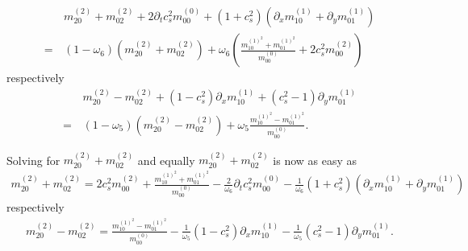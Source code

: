 \begin{align}
  \label{eq: auxiliaries 4}
  &m_{20}^{(2)} + m_{02}^{(2)} + 2\partial_t c_s^2 m_{00}^{(0)} + (1+c_s^2)(\partial_x m_{10}^{(1)} + \partial_y m_{01}^{(1)})
  \\=\,&
  (1-\omega_6)\left(  m_{20}^{(2)} + m_{02}^{(2)}\right)
  + \omega_6 \left( \frac{ m_{10}^{{(1)}^2} + m_{01}^{{(1)}^2}}{m_{00}^{(0)}}
  + 2 c_s^2 m_{00}^{(2)} \right)
\end{align}
respectively
\begin{align}
  \label{eq: auxiliaries 5}
  &m_{20}^{(2)} - m_{02}^{(2)} + (1 - c_s^2)\partial_x m_{10}^{(1)} + (c_s^2 - 1)\partial_y m_{01}^{(1)}
  \\=\,&
  (1-\omega_5) \left(m_{20}^{(2)}-m_{02}^{(2)}\right) + \omega_5 \frac{ m_{10}^{{(1)}^2} - m_{01}^{{(1)}^2}}{m_{00}^{(0)}}.
\end{align}

Solving for $m_{20}^{(2)} + m_{02}^{(2)}$ and equally $m_{20}^{(2)} + m_{02}^{(2)}$ is now as easy as
\begin{align}
  \label{eq: auxiliaries 6}
  m_{20}^{(2)} + m_{02}^{(2)}
  =
  2 c_s^2 m_{00}^{(2)}
  + \frac{ m_{10}^{{(1)}^2} + m_{01}^{{(1)}^2}}{m_{00}^{(0)}}
  - \frac{2}{\omega_6}\partial_t c_s^2 m_{00}^{(0)}
  - \frac{1}{\omega_6}(1+c_s^2)(\partial_x m_{10}^{(1)} + \partial_y m_{01}^{(1)})
\end{align}
respectively
\begin{align}
  \label{eq: auxiliaries 7}
  m_{20}^{(2)} - m_{02}^{(2)}
  =
   \frac{ m_{10}^{{(1)}^2} - m_{01}^{{(1)}^2}}{m_{00}^{(0)}}
   - \frac{1}{\omega_5} (1 - c_s^2)\partial_x m_{10}^{(1)}
   - \frac{1}{\omega_5} (c_s^2 - 1)\partial_y m_{01}^{(1)}.
\end{align}

